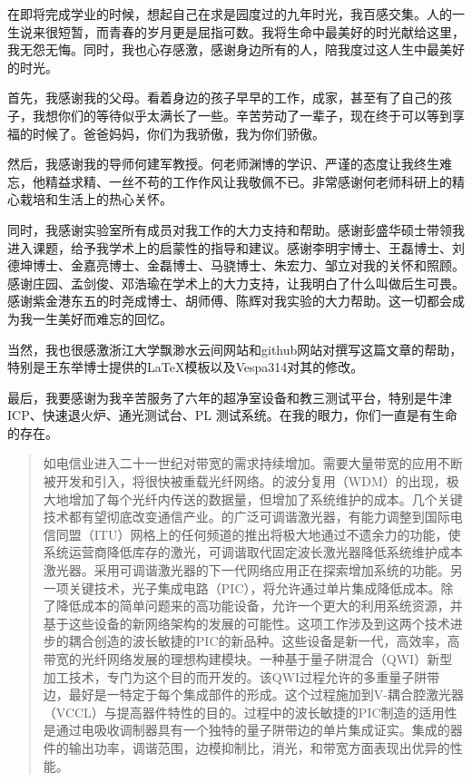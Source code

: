 \documentclass[oneside]{ZJUthesis}
\begin{document}
\begin{thanks}
在即将完成学业的时候，想起自己在求是园度过的九年时光，我百感交集。人的一生说来很短暂，而青春的岁月更是屈指可数。我将生命中最美好的时光献给这里，我无怨无悔。同时，我也心存感激，感谢身边所有的人，陪我度过这人生中最美好的时光。

首先，我感谢我的父母。看着身边的孩子早早的工作，成家，甚至有了自己的孩子，我想你们的等待似乎太满长了一些。辛苦劳动了一辈子，现在终于可以等到享福的时候了。爸爸妈妈，你们为我骄傲，我为你们骄傲。

然后，我感谢我的导师何建军教授。何老师渊博的学识、严谨的态度让我终生难忘，他精益求精、一丝不苟的工作作风让我敬佩不已。非常感谢何老师科研上的精心栽培和生活上的热心关怀。

同时，我感谢实验室所有成员对我工作的大力支持和帮助。感谢彭盛华硕士带领我进入课题，给予我学术上的启蒙性的指导和建议。感谢李明宇博士、王磊博士、刘德坤博士、金嘉亮博士、金磊博士、马骁博士、朱宏力、邹立对我的关怀和照顾。感谢庄园、孟剑俊、邓浩瑜在学术上的大力支持，让我明白了什么叫做后生可畏。感谢紫金港东五的时尧成博士、胡师傅、陈辉对我实验的大力帮助。这一切都会成为我一生美好而难忘的回忆。

当然，我也很感激浙江大学飘渺水云间网站和github网站对撰写这篇文章的帮助，特别是王东举博士提供的LaTeX模板以及Vespa314对其的修改。

最后，我要感谢为我辛苦服务了六年的超净室设备和教三测试平台，特别是牛津ICP、快速退火炉、通光测试台、PL 测试系统。在我的眼力，你们一直是有生命的存在。
\end{thanks}

\begin{abstract}
如电信业进入二十一世纪对带宽的需求持续增加。需要大量带宽的应用不断被开发和引入，将很快被重载光纤网络。的波分复用（WDM）的出现，极大地增加了每个光纤内传送的数据量，但增加了系统维护的成本。几个关键技术都有望彻底改变通信产业。的广泛可调谐激光器，有能力调整到国际电信同盟（ITU）网格上的任何频道的推出将极大地通过不遗余力的功能，使系统运营商降低库存的激光，可调谐取代固定波长激光器降低系统维护成本激光器。采用可调谐激光器的下一代网络应用正在探索增加系统的功能。另一项关键技术，光子集成电路（PIC），将允许通过单片集成降低成本。除了降低成本的简单问题来的高功能设备，允许一个更大的利用系统资源，并基于这些设备的新网络架构的发展的可能性。这项工作涉及到这两个技术进步的耦合创造的波长敏捷的PIC的新品种。这些设备是新一代，高效率，高带宽的光纤网络发展的理想构建模块。一种基于量子阱混合（QWI）新型加工技术，专门为这个目的而开发的。该QWI过程允许的多重量子阱带边，最好是一特定于每个集成部件的形成。这个过程施加到V-耦合腔激光器（VCCL）与提高器件特性的目的。过程中的波长敏捷的PIC制造的适用性是通过电吸收调制器具有一个独特的量子阱带边的单片集成证实。集成的器件的输出功率，调谐范围，边模抑制比，消光，和带宽方面表现出优异的性能。

\end{abstract}
\end{document}

